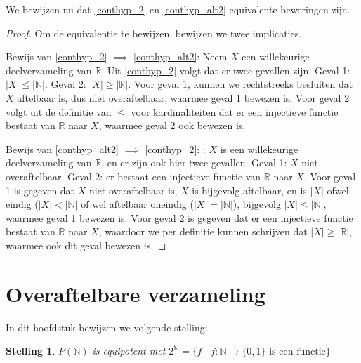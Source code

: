 \documentclass[hidelinks,11pt,a4paper]{article}
\newtheorem{stelling}{Stelling}
\begin{document}
We bewijzen nu dat \eqref{conthyp_2} en \eqref{conthyp_alt2} equivalente beweringen zijn. 

\begin{proof}
Om de equivalentie te bewijzen, bewijzen we twee implicaties.  

Bewijs van \eqref{conthyp_2} $\implies$ \eqref{conthyp_alt2}: Neem $X$ een willekeurige deelverzameling van $\mathbb{R}$. Uit \eqref{conthyp_2} volgt dat er twee gevallen zijn. 
Geval 1: $|X| \leq |\mathbb{N}| $. 
Geval 2: $|X| \geq |\mathbb{R}|$. 
Voor geval 1, kunnen we rechtstreeks besluiten dat $X$ aftelbaar is, dus niet overaftelbaar, waarmee geval 1 bewezen is. 
Voor geval 2 volgt uit de definitie van $\leq$ voor kardinaliteiten dat er een injectieve functie bestaat van $\mathbb{R}$ naar $X$, waarmee geval 2 ook bewezen is. 

Bewijs van \eqref{conthyp_alt2} $\implies$ \eqref{conthyp_2}: : $X$ is een willekeurige deelverzameling van  $\mathbb{R}$, en er zijn ook hier twee gevallen. 
Geval 1: $X$ niet overaftelbaar. 
Geval 2: er bestaat een injectieve functie van $\mathbb{R}$ naar $X$. 
Voor geval 1 is gegeven dat $X$ niet overaftelbaar is, $X$ is bijgevolg aftelbaar, en is $|X|$ ofwel eindig ($|X| < |\mathbb{N}|$ of wel aftelbaar oneindig ($|X| = |\mathbb{N}|$), bijgevolg $|X| \leq |\mathbb{N}| $, waarmee geval 1 bewezen is. 
Voor geval 2 is gegeven dat er een injectieve functie bestaat van $\mathbb{R}$ naar $X$, waardoor we per definitie kunnen schrijven dat $|X| \geq |\mathbb{R}|$, waarmee ook dit geval bewezen is. 
\end{proof}

\section{Overaftelbare verzameling}
\label{sec_overaft}
In dit hoofdstuk bewijzen we volgende stelling: 

\begin{stelling}
\label{stelling_overaftelbaar}
$ P(\mathbb{N})$ is equipotent met $2^{\mathbb{N}} = \{ f \mid f : \mathbb{N} \rightarrow \{0,1\} \text{ is een functie}  \} $
\end{stelling}
\end{document}
